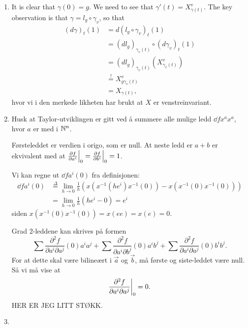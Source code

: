 \documentclass[11pt, english]{article}
\begin{document}
\begin{sol}
  \begin{enumerate}
  \item It is clear that $\gamma(0)=g$. We need to see that $\gamma'(t)=X_{\gamma(t)}^v$. The key observation is that $\gamma = l_g \circ \gamma_v$, so that
\begin{align*}
(d\gamma)_t(1) &= d(l_g \circ \gamma_v)_t(1) \\
&= (d l_g)_{\gamma_v(t)} \circ (d \gamma_v)_t(1) \\
&= (d l_g)_{\gamma_v(t)}(X^v_{\gamma_v(t)}) \\
&\stackrel{!}{=} X^v_{g \gamma_v(t)} \\
&= X_{\gamma(t)},
\end{align*}
hvor vi i den merkede likheten har brukt at $X$ er venstreinvariant.

 \item Husk at Taylor-utviklingen er gitt ved å summere alle mulige ledd $\dd{f}{x^{a}} x^{a}$, hvor $a$ er med i $\mathbb{N}^n$. 

Førsteleddet er verdien i origo, som er null. At neste ledd er $a+b$ er ekvivalent med at $\restr{\dd{f}{a^i}}{0} = \restr{\dd{f}{b^i}}{0}= 1$. 

Vi kan regne ut $\dd{f}{a^i}(0)$ fra definisjonen:
\begin{align*}
\dd{f}{a^i}(0) &\stackrel{\Delta}{=} \lim_{h \to 0} \frac 1h \left( x(x^{-1}(he^i)x^{-1}(0))-x(x^{-1}(0)x^{-1}(0)) \right) \\
&=  \lim_{h \to 0} \frac 1h  (he^i-0) = e^i
\end{align*}
siden $x(x^{-1}(0)x^{-1}(0))=x(ee)=x(e)=0$.

Grad 2-leddene kan skrives på formen
\[
\sum \frac{\partial^2 f}{\partial a^i \partial a^j}(0) a^i a^j + 
\sum \frac{\partial^2 f}{\partial a^i \partial b^j}(0) a^i b^j +
\sum \frac{\partial^2 f}{\partial a^i \partial a^j}(0) b^i b^j.
\]
For at dette skal være bilineært i $\vec a$ og $\vec b$, må første og siste-leddet være null. Så vi må vise at 
$$
\restr{\frac{\partial^2 f}{\partial a^i \partial a^j}}{0}= 0.
$$
HER ER JEG LITT STØKK. 
\item 
  \end{enumerate}
\end{sol}
\end{document}

